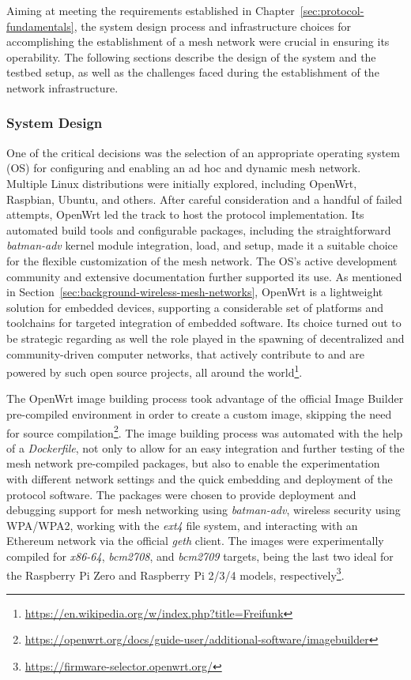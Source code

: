 Aiming at meeting the requirements established in Chapter~\ref{sec:protocol-fundamentals}, the system design process and infrastructure choices for accomplishing the establishment of a mesh network were crucial in ensuring its operability. The following sections describe the design of the system and the testbed setup, as well as the challenges faced during the establishment of the network infrastructure.

\subsubsection{System Design} \label{sec:infrastructure}

One of the critical decisions was the selection of an appropriate operating system (OS) for configuring and enabling an ad hoc and dynamic mesh network. Multiple Linux distributions were initially explored, including OpenWrt, Raspbian, Ubuntu, and others. After careful consideration and a handful of failed attempts, OpenWrt led the track to host the protocol implementation. Its automated build tools and configurable packages, including the straightforward \emph{batman-adv} kernel module integration, load, and setup, made it a suitable choice for the flexible customization of the mesh network. The OS's active development community and extensive documentation further supported its use. As mentioned in Section~\ref{sec:background-wireless-mesh-networks}, OpenWrt is a lightweight solution for embedded devices, supporting a considerable set of platforms and toolchains for targeted integration of embedded software. Its choice turned out to be strategic regarding as well the role played in the spawning of decentralized and community-driven computer networks, that actively contribute to and are powered by such open source projects, all around the world\footnote{\url{https://en.wikipedia.org/w/index.php?title=Freifunk}}.

The OpenWrt image building process took advantage of the official Image Builder pre-compiled environment in order to create a custom image, skipping the need for source compilation\footnote{\url{https://openwrt.org/docs/guide-user/additional-software/imagebuilder}}. The image building process was automated with the help of a \emph{Dockerfile}, not only to allow for an easy integration and further testing of the mesh network pre-compiled packages, but also to enable the experimentation with different network settings and the quick embedding and deployment of the \pol{} protocol software. The packages were chosen to provide deployment and debugging support for mesh networking using \emph{batman-adv}, wireless security using WPA/WPA2, working with the \emph{ext4} file system, and interacting with an Ethereum network via the official \emph{geth} client. The images were experimentally compiled for \emph{x86-64}, \emph{bcm2708}, and \emph{bcm2709} targets, being the last two ideal for the Raspberry Pi Zero and Raspberry Pi 2/3/4 models, respectively\footnote{\url{https://firmware-selector.openwrt.org/}}.

